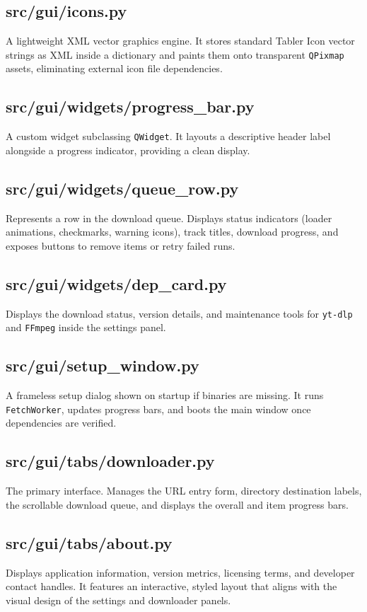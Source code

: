 \documentclass[12pt]{report}
\begin{document}
\subsection{src/gui/icons.py}
A lightweight XML vector graphics engine. It stores standard Tabler Icon vector strings as XML inside a dictionary and paints them onto transparent \texttt{QPixmap} assets, eliminating external icon file dependencies.

\subsection{src/gui/widgets/progress\_bar.py}
A custom widget subclassing \texttt{QWidget}. It layouts a descriptive header label alongside a progress indicator, providing a clean display.

\subsection{src/gui/widgets/queue\_row.py}
Represents a row in the download queue. Displays status indicators (loader animations, checkmarks, warning icons), track titles, download progress, and exposes buttons to remove items or retry failed runs.

\subsection{src/gui/widgets/dep\_card.py}
Displays the download status, version details, and maintenance tools for \texttt{yt-dlp} and \texttt{FFmpeg} inside the settings panel.

\subsection{src/gui/setup\_window.py}
A frameless setup dialog shown on startup if binaries are missing. It runs \texttt{FetchWorker}, updates progress bars, and boots the main window once dependencies are verified.

\subsection{src/gui/tabs/downloader.py}
The primary interface. Manages the URL entry form, directory destination labels, the scrollable download queue, and displays the overall and item progress bars.

\subsection{src/gui/tabs/about.py}
Displays application information, version metrics, licensing terms, and developer contact handles. It features an interactive, styled layout that aligns with the visual design of the settings and downloader panels.
\end{document}
